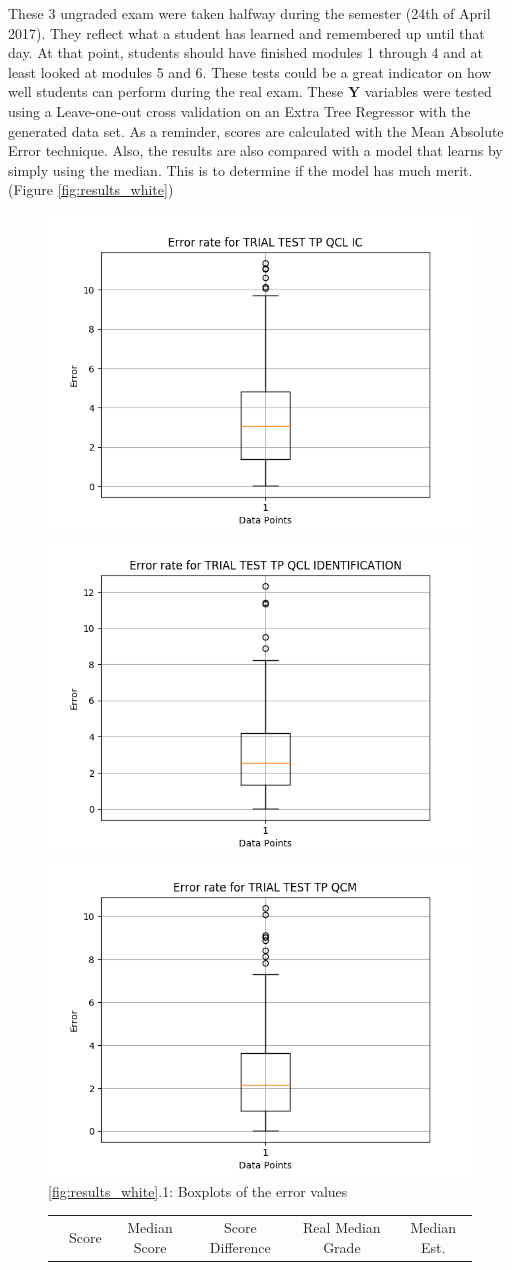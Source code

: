 \documentclass[a4paper,11pt]{report}
\numberwithin{figure}{section} %
\begin{document}
    These 3 ungraded exam were taken halfway during the semester (24th of April 2017).
    They reflect what a student has learned and remembered up until that day.
    At that point, students should have finished modules 1 through 4 and at least looked at modules 5 and 6.
    These tests could be a great indicator on how well students can perform during the real exam.
    These \textbf{Y} variables were tested using a Leave-one-out cross validation on an Extra Tree Regressor with the generated data set.
    As a reminder, scores are calculated with the Mean Absolute Error technique.
    Also, the results are also compared with a model that learns by simply using the median.
    This is to determine if the model has much merit. (Figure \ref{fig:results_white})
    \begin{figure}[H]
      \centering
  	  \includegraphics[width=.3\linewidth]{cv_boxplot_TRIAL_TEST_TP_QCL_IC_2018-04-27_14_35_12.png}
  	  \includegraphics[width=.3\linewidth]{cv_boxplot_TRIAL_TEST_TP_QCL_IDENTIFICATION_2018-04-27_14_31_56.png}
      \includegraphics[width=.3\linewidth]{cv_boxplot_TRIAL_TEST_TP_QCM_2018-04-27_17_16_59.png}
      \\
      \ref{fig:results_white}.1: Boxplots of the error values
      \\
      \vspace{0.5cm}
      \begin{tabular}{| l | c | c | c | c | c |}
      \hline
      & \tiny{Score} & \tiny{Median Score} & \tiny{Score Difference} & \tiny{Real Median Grade} & \tiny{Median Est.
}
\end{tabular}
\end{figure}
\end{document}

